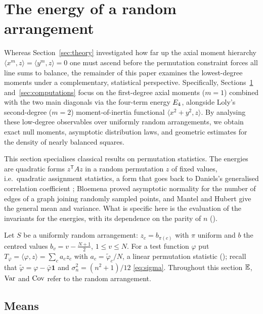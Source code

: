\section{The energy of a random arrangement}
\label{sec:random_energy}

Whereas Section~\ref{sec:theory} investigated how far up the axial moment hierarchy $\langle x^m,z\rangle=\langle y^m,z\rangle=0$ one must ascend before the permutation constraint forces all line sums to balance, the remainder of this paper examines the lowest-degree moments under a complementary, statistical perspective.
Specifically, Sections~\ref{sec:random_energy} and~\ref{sec:computations} focus on the first-degree axial moments ($m=1$) combined with the two main diagonals via the four-term energy $E_4$, alongside Loly's second-degree ($m=2$) moment-of-inertia functional $\langle x^2+y^2,z\rangle$.
By analysing these low-degree observables over uniformly random arrangements, we obtain exact null moments, asymptotic distribution laws, and geometric estimates for the density of nearly balanced squares.

This section specialises classical results on permutation statistics.
The energies are quadratic forms $z^{\mathsf T}Az$ in a random permutation $z$ of fixed values, i.e.\ quadratic assignment statistics, a form that goes back to Daniels's generalised correlation coefficient \cite{daniels1944}; Bloemena \cite{bloemena1964} proved asymptotic normality for the number of edges of a graph joining randomly sampled points, and Mantel \cite{mantel1967} and Hubert \cite{hubert1987assignment} give the general mean and variance.
What is specific here is the evaluation of the invariants for the energies, with its dependence on the parity of $n$ ().

Let $S$ be a uniformly random arrangement: $z_c=b_{\pi(c)}$ with $\pi$ uniform and $b$ the centred values $b_v=v-\frac{N+1}2$, $1\le v\le N$.
For a test function $\varphi$ put $T_\varphi=\langle\varphi,z\rangle=\sum_ca_cz_c$ with $a_c=\tilde\varphi_c/N$, a linear permutation statistic (); recall that $\tilde\varphi=\varphi-\bar\varphi\mathbf 1$ and $\sigma_n^2=(n^2+1)/12$ \eqref{eq:sigma}.
Throughout this section $\mathbb{E}$, $\mathrm{Var}$ and $\mathrm{Cov}$ refer to the random arrangement.

\subsection{Means}

